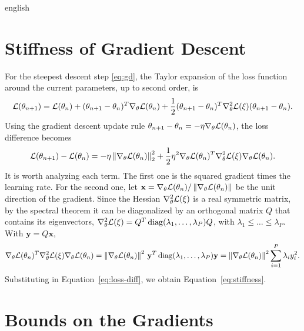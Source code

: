 \begin{hyphenrules}{english}
\section{Stiffness of Gradient Descent}\label{app-sec:stiffness}

For the steepest descent step \eqref{eq:gd}, the Taylor expansion of the loss function around the
current parameters, up to second order, is
\begin{equation}
  \mathcal{L}(\theta_{n+1})=\mathcal{L}(\theta_n)+(\theta_{n+1}-\theta_n)^{T}\nabla_\theta\mathcal{L}(\theta_n)
  +\frac12(\theta_{n+1}-\theta_n)^{T}\nabla^2_\theta\mathcal{L}(\xi)(\theta_{n+1}-\theta_n).
  \label{eq:taylor}
\end{equation}
Using the gradient descent update rule $\theta_{n+1}-\theta_n=-\eta\nabla_\theta\mathcal{L}(\theta_n)$, the
loss difference becomes
\begin{equation}
  \mathcal{L}(\theta_{n+1})-\mathcal{L}(\theta_n)=-\eta\left\lVert \nabla_\theta\mathcal{L}(\theta_n) \right\rVert_2^2
  +\frac12\eta^2\nabla_\theta\mathcal{L}(\theta_n)^{T}\nabla^2_\theta\mathcal{L}(\xi)\nabla_\theta\mathcal{L}(\theta_n).
  \label{eq:loss-diff}
\end{equation}
It is worth analyzing each term. The first one is the squared gradient times the learning rate. For the
second one, let $\mathbf{x}=\nabla_\theta\mathcal{L}(\theta_n)/\left\lVert \nabla_\theta\mathcal{L}(\theta_n) \right\rVert$ be the unit
direction of the gradient. Since the Hessian $\nabla^2_\theta\mathcal{L}(\xi)$ is a real symmetric matrix, by the
spectral theorem \cite{trefethen1997} it can be diagonalized by an orthogonal matrix $Q$ that contains
its eigenvectors, $\nabla^2_\theta\mathcal{L}(\xi)=Q^{T}\operatorname{diag}(\lambda_1,\dots,\lambda_P)Q$, with
$\lambda_1\le\dots\le\lambda_P$. With $\mathbf{y}=Q\mathbf{x}$,
\begin{equation}
  \nabla_\theta\mathcal{L}(\theta_n)^{T}\nabla^2_\theta\mathcal{L}(\xi)\nabla_\theta\mathcal{L}(\theta_n)
  =\left\lVert \nabla_\theta\mathcal{L}(\theta_n) \right\rVert^2\,\mathbf{y}^{T}\operatorname{diag}(\lambda_1,\dots,\lambda_P)\mathbf{y}
  =\left\lVert \nabla_\theta\mathcal{L}(\theta_n) \right\rVert^2\sum_{i=1}^{P}\lambda_iy_i^2.
  \label{eq:hessian-quadratic}
\end{equation}
Substituting in Equation~\eqref{eq:loss-diff}, we obtain Equation~\eqref{eq:stiffness}.

\section{Bounds on the Gradients}\label{app-sec:grad-bounds}


\end{hyphenrules}
